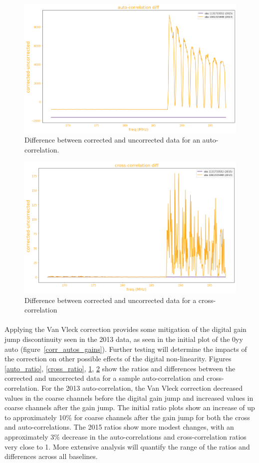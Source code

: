 \documentclass[11pt]{article}
\begin{document}
\begin{figure}
\centering{}
\includegraphics[width=135mm]{auto_diff.png}
\caption{Difference between corrected and uncorrected data for an auto-correlation.\label{auto_diff}}
\end{figure}
\begin{figure}
\centering{}
\includegraphics[width=135mm]{cross_diff.png}
\caption{Difference between corrected and uncorrected data for a cross-correlation\label{cross_diff}}
\end{figure}
\paragraph{}
Applying the Van Vleck correction provides some mitigation of the digital gain jump discontinuity seen in the 2013 data, as seen in the initial plot of the 0yy auto (figure~\ref{corr_autos_gains}). Further testing will determine the impacts of the correction on other possible effects of the digital non-linearity. Figures \ref{auto_ratio}, \ref{cross_ratio}, \ref{auto_diff}, \ref{cross_diff} show the ratios and differences between the corrected and uncorrected data for a sample auto-correlation and cross-correlation. For the 2013 auto-correlation, the Van Vleck correction decreased values in the coarse channels before the digital gain jump and increased values in coarse channels after the gain jump. The initial ratio plots show an increase of up to approximately 10\% for coarse channels after the gain jump for both the cross and auto-correlations. The 2015 ratios show more modest changes, with an approximately 3\% decrease in the auto-correlations and cross-correlation ratios very close to 1. More extensive analysis will quantify the range of the ratios and differences across all baselines.
\end{document}
